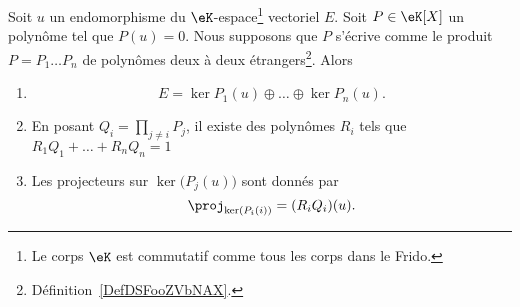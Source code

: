 \begin{theorem}       \label{ThoDecompNoyayzzMWod}
	Soit \( u\) un endomorphisme du \( \eK\)-espace\footnote{Le corps \( \eK\) est commutatif comme tous les corps dans le Frido.} vectoriel \( E\). Soit \( P\in\eK[X]\) un polynôme tel que \( P(u)=0\). Nous supposons que \( P\) s'écrive comme le produit \( P=P_1\ldots P_n\) de polynômes deux à deux étrangers\footnote{Définition~\ref{DefDSFooZVbNAX}.}. Alors
	\begin{enumerate}
		\item
		      \begin{equation}
			      E=\ker P_1(u)\oplus\ldots\oplus\ker P_n(u).
		      \end{equation}
		\item
		      En posant \( Q_i=\prod_{j\neq i}P_j\), il existe des polynômes \( R_i\) tels que \( R_1Q_1+\ldots +R_nQ_n=1\)
		\item       \label{ITEMooMOBPooPVXuXj}
		      Les projecteurs sur \( \ker\big( P_j(u) \big)\) sont donnés par
		      \begin{equation}
			      \proj_{\ker(P_i(i))}=(R_iQ_i)(u).
		      \end{equation}
	\end{enumerate}
\end{theorem}

